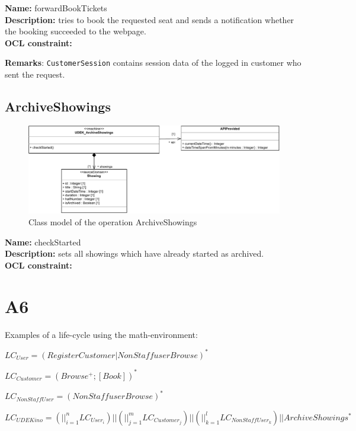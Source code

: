 \documentclass[a4paper,10pt,titlepage,bibtotoc,bibtotocnumbered]{scrreprt}
\begin{document}
\textbf{Name:} forwardBookTickets
\\
\textbf{Description:} tries to book the requested seat and sends a notification whether the booking succeeded to the webpage.
\\
\textbf{OCL constraint:}

\textbf{Remarks}: \lstinline|CustomerSession| contains session data of the logged in customer who sent the request.

\subsection{ArchiveShowings}

\begin{figure}[H]
    \centering
    \includegraphics[width = \textwidth]{figures/07/a07_class_diagram_ArchiveShowings.pdf}
    \caption{Class model of the operation ArchiveShowings}
    \label{figure:operation_ArchiveShowings_class_diagram}
\end{figure}

\textbf{Name:} checkStarted
\\
\textbf{Description:} sets all showings which have already started as archived.
\\
\textbf{OCL constraint:}


\newpage\section{A6}

Examples of a life-cycle using the math-environment:

$LC_{User}=(RegisterCustomer|NonStaffuserBrowse)^*$

$LC_{Customer}=(Browse^+;[Book])^*$

$LC_{NonStaffUser}=(NonStaffuserBrowse)^*$

$LC_{UDEKino}=(||_{i=1}^{n}LC_{User_i})||(||_{j=1}^{m}LC_{Customer_j})||(||_{k=1}^{l}LC_{NonStaffUser_k})||ArchiveShowings^*$
\end{document}
